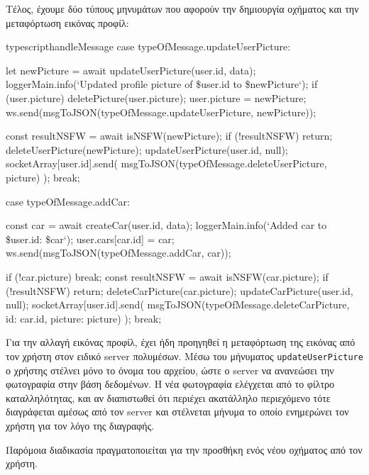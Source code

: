 \documentclass[../thesis.tex]{subfiles}
\begin{document}
Τέλος, έχουμε δύο τύπους μηνυμάτων που αφορούν την δημιουργία οχήματος και την μεταφόρτωση εικόνας προφίλ:

\begin{codeblock}{typescript}{handleMessage}
  case typeOfMessage.updateUserPicture: {
    let newPicture = await updateUserPicture(user.id, data);
    loggerMain.info(`Updated profile picture of \${user.id} to \${newPicture}`);
    if (user.picture) deletePicture(user.picture);
    user.picture = newPicture;
    ws.send(msgToJSON(typeOfMessage.updateUserPicture, newPicture));

    const resultNSFW = await isNSFW(newPicture);
    if (!resultNSFW) return;
    deleteUserPicture(newPicture);
    updateUserPicture(user.id, null);
    socketArray[user.id].send(
      msgToJSON(typeOfMessage.deleteUserPicture, picture)
    );
    break;
  }
  case typeOfMessage.addCar: {
    const car = await createCar(user.id, data);
    loggerMain.info(`Added car to \${user.id}: \${car}`);
    user.cars[car.id] = car;
    ws.send(msgToJSON(typeOfMessage.addCar, car));

    if (!car.picture) break;
    const resultNSFW = await isNSFW(car.picture);
    if (!resultNSFW) return;
    deleteCarPicture(car.picture);
    updateCarPicture(user.id, null);
    socketArray[user.id].send(
      msgToJSON(typeOfMessage.deleteCarPicture, {id: car.id, picture: picture})
    );
    break;
  }
\end{codeblock}

Για την αλλαγή εικόνας προφίλ, έχει ήδη προηγηθεί η μεταφόρτωση της εικόνας από τον χρήστη στον ειδικό server πολυμέσων.
Μέσω του μήνυματος \texttt{updateUserPicture} ο χρήστης στέλνει μόνο το όνομα του αρχείου, ώστε ο server να ανανεώσει την φωτογραφία στην βάση δεδομένων.
Η νέα φωτογραφία ελέγχεται από το φίλτρο καταλληλότητας, και αν διαπιστωθεί ότι περιέχει ακατάλληλο περιεχόμενο τότε διαγράφεται αμέσως από τον server και στέλνεται μήνυμα το οποίο ενημερώνει τον χρήστη για τον λόγο της διαγραφής.

Παρόμοια διαδικασία πραγματοποιείται για την προσθήκη ενός νέου οχήματος από τον χρήστη.
\end{document}
